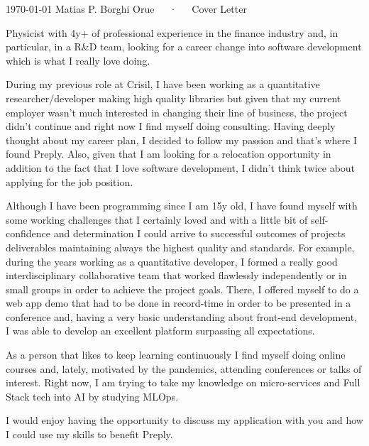 \documentclass[11pt, a4paper]{awesome-cv}
\newcommand{\myname}{Matias P.}
\newcommand{\mysurname}{Borghi Orue}
\newcommand{\company}{Preply}
\begin{document}
\makecvheader[C]

\makecvfooter
  {\today}
  {\myname {} \mysurname~~~·~~~Cover Letter}
  {}

\makelettertitle

\begin{cvletter}

Physicist with 4y+ of professional experience in the finance industry and, in particular, in a R\&D team, looking for a career change into software development which is what I really love doing.


\lettersection{Why \company?}
During my previous role at Crisil, I have been working as a quantitative researcher/developer making high quality libraries but given that my current employer wasn't much interested in changing their line of business, the project didn't continue and right now I find myself doing consulting. Having deeply thought about my career plan, I decided to follow my passion and that's where I found \company. Also, given that I am looking for a relocation opportunity in addition to the fact that I love software development, I didn't think twice about applying for the job position.


Although I have been programming since I am 15y old, I have found myself with some working challenges that I certainly loved and with a little bit of self-confidence and determination I could arrive to successful outcomes of projects deliverables maintaining always the highest quality and standards. For example, during the years working as a quantitative developer, I formed a really good interdisciplinary collaborative team that worked flawlessly independently or in small groups in order to achieve the project goals. There, I offered myself to do a web app demo that had to be done in record-time in order to be presented in a conference and, having a very basic understanding about front-end development, I was able to develop an excellent platform surpassing all expectations. 

As a person that likes to keep learning continuously I find myself doing online courses and, lately, motivated by the pandemics, attending conferences or talks of interest. Right now, I am trying to take my knowledge on micro-services and Full Stack tech into AI by studying MLOps.

I would enjoy having the opportunity to discuss my application with you and how I could use my skills to benefit \company.


\end{cvletter}


\makeletterclosing
\end{document}
